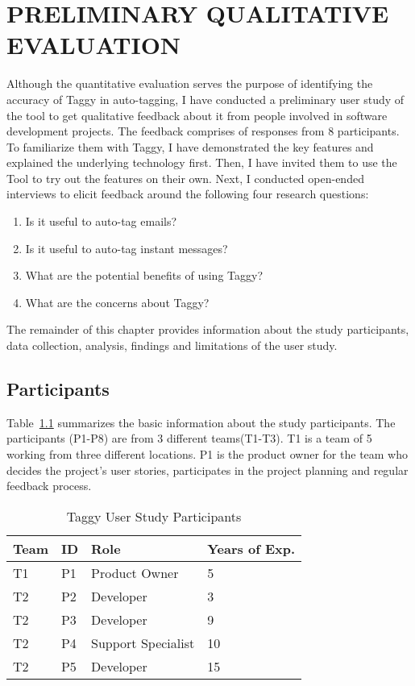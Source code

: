 \fancyhead[RO,LE]{\thepage}
\fancyfoot{} 
\chapter{PRELIMINARY QUALITATIVE EVALUATION}
Although the quantitative evaluation serves the purpose of identifying the accuracy of Taggy in auto-tagging, I have conducted a preliminary user study of the tool to get qualitative feedback about it from people involved in software development projects. The feedback comprises of responses from 8 participants. To familiarize them with Taggy, I have demonstrated the key features and explained the underlying technology first. Then, I have invited them to use the Tool to try out the features on their own. Next, I conducted open-ended interviews to elicit feedback around the following four research questions:

\begin{enumerate}
	\item Is it useful to auto-tag emails?
	\item Is it useful to auto-tag instant messages?
	\item What are the potential benefits of using Taggy?
	\item What are the concerns about Taggy?
\end{enumerate}

The remainder of this chapter provides information about the study participants, data collection, analysis, findings and limitations of the user study.

\section{Participants}
Table~\ref{tab:participants} summarizes the basic information about the study participants. The participants (P1-P8) are from 3 different teams(T1-T3). T1 is a team of 5 working from three different locations. P1 is the product owner for the team who decides the project's user stories, participates in the project planning and regular feedback process. 

\begin{table}
	\label{tab:participants}
  \centering
  \caption{Taggy User Study Participants}
    \begin{tabular}{|p{2cm}|p{2cm}|p{2cm}|p{2cm}|}
    \hline
		Team & ID & Role & Years of Exp.\\
		\hline
		T1	&  P1 & Product Owner & 5 \\
		T2	&  P2 & Developer & 3 \\
		T2	&  P3 & Developer & 9 \\
		T2	&  P4 & Support Specialist & 10 \\
		T2	&  P5 & Developer & 15\\		
		\hline
		\end{tabular}
\end{table}                                              

